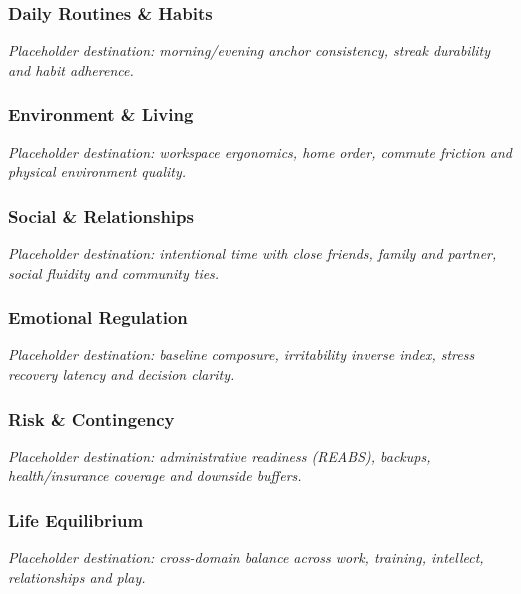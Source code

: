 \documentclass{article}
\begin{document}
\subsubsection{Daily Routines \& Habits}\label{sec:daily-routines-and-habits}
\textit{Placeholder destination: morning/evening anchor consistency, streak durability and habit adherence.}

\subsubsection{Environment \& Living}\label{sec:environment-and-living}
\textit{Placeholder destination: workspace ergonomics, home order, commute friction and physical environment quality.}

\subsubsection{Social \& Relationships}\label{sec:social-and-relationships}
\textit{Placeholder destination: intentional time with close friends, family and partner, social fluidity and community ties.}

\subsubsection{Emotional Regulation}\label{sec:emotional-regulation}
\textit{Placeholder destination: baseline composure, irritability inverse index, stress recovery latency and decision clarity.}

\subsubsection{Risk \& Contingency}\label{sec:risk-and-contingency}
\textit{Placeholder destination: administrative readiness (REABS), backups, health/insurance coverage and downside buffers.}

\subsubsection{Life Equilibrium}\label{sec:life-equilibrium}
\textit{Placeholder destination: cross-domain balance across work, training, intellect, relationships and play.}
\end{document}
